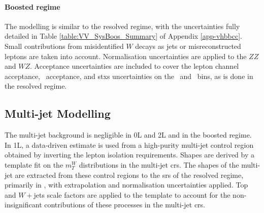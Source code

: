 \paragraph{Boosted regime} The modelling is similar to the resolved regime, with the uncertainties fully detailed in Table \ref{table:VV_SysBoos_Summary} of Appendix \ref{app-vhbbcc}. Small contributions from misidentified $W$ decays as jets or misreconstructed leptons are taken into account. Normalisation uncertainties are applied to the $ZZ$ and $WZ$. Acceptance uncertainties are included to cover the lepton channel acceptance, \ptv\ acceptance, and \gls{stxs} uncertainties on the \ptv\ and \nj\ bins, as is done in the resolved regime.

\subsection{Multi-jet Modelling}\label{sec-modMultiJ} 
The multi-jet background is negligible in 0L and 2L and in the boosted regime. In 1L, a data-driven estimate is used from a high-purity multi-jet control region obtained by inverting the lepton isolation requirements. Shapes are derived by a template fit on the $m_T^W$ distributions in the multi-jet \glspl{cr}. The shapes of the multi-jet are extracted from these control regions to the \glspl{sr} of the resolved regime, primarily in \vhc, with extrapolation and normalisation uncertainties applied. Top and $W+$jets scale factors are applied to the template to account for the non-insignificant contributions of these processes in the multi-jet \glspl{cr}.